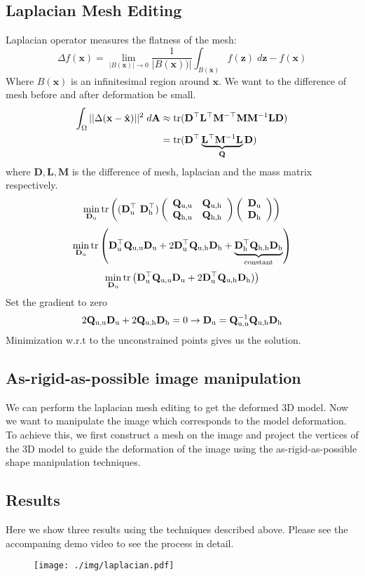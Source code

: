 \subsection{Laplacian Mesh Editing}
Laplacian operator measures the flatness of the mesh:
$$\Delta f(\mathbf{x}) = \lim_{|B(\mathbf{x})| \rightarrow 0} \frac{1}{|B(\mathbf{x}))|} \int_{B(\mathbf{x})} f(\mathbf{z}) \;d\mathbf{z} - f(\mathbf{x})$$
Where $B(\mathbf{x})$ is an infinitesimal region around $\mathbf{x}$.
We want to the difference of mesh before and after deformation be small.  
\begin{align*}
\int_\Omega ||\Delta(\mathbf{x} - \hat{\mathbf{x}})||^2 \; d\mathbf{A} & \approx \text{tr}( \mathbf{D}^\top \mathbf{L}^\top \mathbf{M}^{-\top} \mathbf{M} \mathbf{M}^{-1} \mathbf{L}\mathbf{D})\\
&= \text{tr}(  \mathbf{D}^\top \underbrace{\mathbf{L}^\top \mathbf{M}^{-1} \mathbf{L}}_{\mathbf{Q}} \mathbf{D})
\end{align*}
where $\mathbf{D}, \mathbf{L}, \mathbf{M}$ is the difference of mesh, laplacian and the mass matrix respectively. 
$$
\min_{\mathbf{D}_\text{u}}
\operatorname{tr} \left((\mathbf{D}_\text{u}^\top \ \mathbf{D}_\text{h}^\top)
\left(\begin{array}{cc}
\mathbf{Q}_\text{u,u} & \mathbf{Q}_\text{u,h} \\
\mathbf{Q}_\text{h,u} & \mathbf{Q}_\text{h,h} 
\end{array}\right)
\left(\begin{array}{c}
  \mathbf{D}_\text{u} \\
  \mathbf{D}_\text{h}
\end{array}
\right)\right)
$$
$$
\min_{\mathbf{D}_\text{u}}
\operatorname{tr}\left(\mathbf{D}_\text{u}^\top \mathbf{Q}_\text{u,u} \mathbf{D}_\text{u} +
2 \mathbf{D}_\text{u}^\top \mathbf{Q}_\text{u,h} \mathbf{D}_\text{h} + 
\underbrace{\mathbf{D}_\text{h}^\top \mathbf{Q}_\text{h,h}
\mathbf{D}_\text{h}}_\text{constant}\right)
$$
$$
\min_{\mathbf{D}_\text{u}} 
\operatorname{tr}\left(
\mathbf{D}_\text{u}^\top \mathbf{Q}_\text{u,u} \mathbf{D}_\text{u} +
2 \mathbf{D}_\text{u}^\top \mathbf{Q}_\text{u,h} \mathbf{D}_\text{h})
\right)
$$
Set the gradient to zero
$$2 \mathbf{Q}_\text{u,u} \mathbf{D}_\text{u} + 2 \mathbf{Q}_\text{u,h} \mathbf{D}_\text{h} = 0 \rightarrow \mathbf{D}_\text{u} = \mathbf{Q}_\text{u,u}^{-1} \mathbf{Q}_\text{u,h} \mathbf{D}_\text{h}$$
Minimization w.r.t to the unconstrained points gives us the solution.

\subsection{As-rigid-as-possible image manipulation}
We can perform the laplacian mesh editing to get the deformed 3D model. Now we want to manipulate the image which corresponds to the model deformation. To achieve this, we first construct a mesh on the image and project the vertices of the 3D model to guide the deformation of the image using the as-rigid-as-possible shape manipulation techniques\cite{igarashi2005rigid}.

\subsection{Results}
Here we show three results using the techniques described above. Please see the accompaning demo video to see the process in detail.
\begin{figure}[H]
  \texttt{[image: ./img/laplacian.pdf]}
\end{figure}